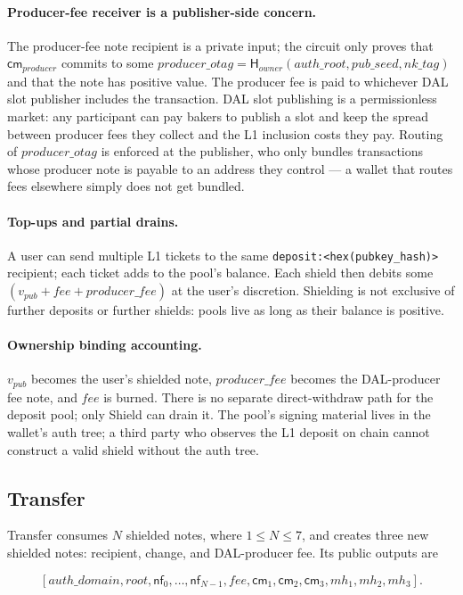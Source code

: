 \documentclass[11pt]{article}
\newcommand{\Hash}{\mathsf{H}}
\newcommand{\cm}{\mathsf{cm}}
\newcommand{\nf}{\mathsf{nf}}
\newcommand{\depositkey}{\texttt{deposit:}\allowbreak\texttt{<hex(}\allowbreak\texttt{pubkey\_hash}\allowbreak\texttt{)>}}
\begin{document}
\paragraph{Producer-fee receiver is a publisher-side concern.} The
producer-fee note recipient is a private input; the circuit only proves
that \(\cm_{producer}\) commits to some
\(producer\_otag = \Hash_{owner}(auth\_root, pub\_seed, nk\_tag)\) and
that the note has positive value. The producer fee is paid to whichever
DAL slot publisher includes the transaction. DAL slot publishing is a
permissionless market: any participant can pay bakers to publish a slot
and keep the spread between producer fees they collect and the L1
inclusion costs they pay. Routing of \(producer\_otag\) is enforced at
the publisher, who only bundles transactions whose producer note is
payable to an address they control — a wallet that routes fees
elsewhere simply does not get bundled.

\paragraph{Top-ups and partial drains.} A user can send multiple L1
tickets to the same \depositkey{} recipient; each
ticket adds to the pool's balance. Each shield then debits some
\((v_{pub} + fee + producer\_fee)\) at the user's discretion. Shielding
is not exclusive of further deposits or further shields: pools live as
long as their balance is positive.

\paragraph{Ownership binding accounting.} \(v_{pub}\) becomes the user's
shielded note, \(producer\_fee\) becomes the DAL-producer fee note, and
\(fee\) is burned. There is no separate direct-withdraw path for the
deposit pool; only Shield can drain it. The pool's signing material
lives in the wallet's auth tree; a third party who observes the L1
deposit on chain cannot construct a valid shield without the auth tree.

\subsection{Transfer}

Transfer consumes \(N\) shielded notes, where \(1 \leq N \leq 7\), and creates
three new shielded notes: recipient, change, and DAL-producer fee. Its public
outputs are

\[
[auth\_domain, root, \nf_0, \ldots, \nf_{N-1}, fee,
 \cm_1, \cm_2, \cm_3, mh_1, mh_2, mh_3].
\]
\end{document}
